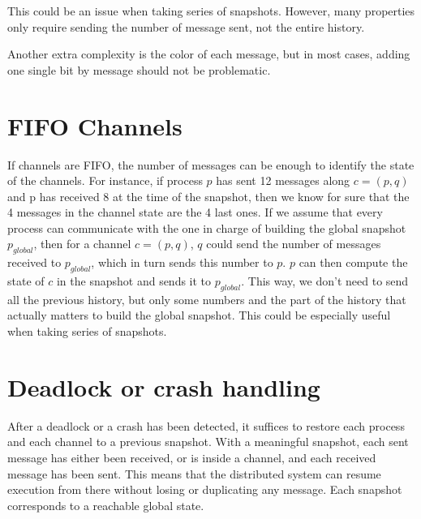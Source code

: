 \documentclass{article}
\begin{document}
This could be an issue when taking series of snapshots. However, many properties only require sending the number of message sent, not the entire history.

Another extra complexity is the color of each message, but in most cases, adding one single bit by message should not be problematic.

\section{FIFO Channels}

If channels are FIFO, the number of messages can be enough to identify the state of the channels.
For instance, if process $p$ has sent 12 messages along $c=(p,q)$ and p has received 8 at the time of the snapshot, then we know for sure that the 4 messages in the channel state are the 4 last ones.
If we assume that every process can communicate with the one in charge of building the global snapshot $p_{global}$, then for a channel $c=(p,q)$, $q$ could send the number of messages received to $p_{global}$, which in turn sends this number to $p$. $p$ can then compute the state of $c$ in the snapshot and sends it to $p_{global}$.
This way, we don't need to send all the previous history, but only some numbers and the part of the history that actually matters to build the global snapshot. This could be especially useful when taking series of snapshots.

\section{Deadlock or crash handling}

After a deadlock or a crash has been detected, it suffices to restore each process and each channel to a previous snapshot.
With a meaningful snapshot, each sent message has either been received, or is inside a channel, and each received message has been sent. This means that the distributed system can resume execution from there without losing or duplicating any message.
Each snapshot corresponds to a reachable global state.
\end{document}
